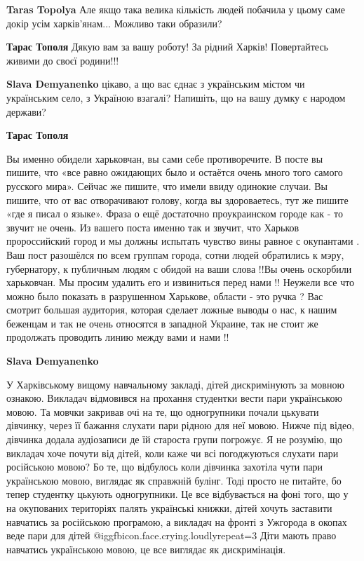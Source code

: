 \begin{itemize}
\begin{itemize}
\textbf{Taras Topolya} Але якщо така велика кількість людей побачила у цьому саме докір усім харків'янам... Можливо таки образили?

\textbf{Тарас Тополя} Дякую вам за вашу роботу! За рідний Харків! Повертайтесь живими до своєї родини!!!

\textbf{Slava Demyanenko} цікаво, а що вас єднає з українським містом чи українським село, з Україною взагалі? Напишіть, що на вашу думку є народом держави?

\textbf{Тарас Тополя} 

Вы именно обидели харьковчан, вы сами себе противоречите. В посте вы пишите,
что «все равно ожидающих было и остаётся очень много того самого русского
мира». Сейчас же пишите, что имели ввиду одинокие случаи. Вы пишите, что от
вас отворачивают голову, когда вы здороваетесь, тут же пишите «где я писал о
языке». Фраза о ещё достаточно проукраинском городе как - то звучит не очень.
Из вашего поста именно так и звучит, что Харьков пророссийский город и мы
должны испытать чувство вины равное с окупантами . Ваш пост разошёлся по всем
группам города, сотни людей обратились к мэру, губернатору, к публичным
людям с обидой на ваши слова !!Вы очень оскорбили харьковчан. Мы просим
удалить его и извиниться перед нами !! Неужели все что можно было показать в
разрушенном Харькове, области - это ручка ? Вас смотрит большая аудитория,
которая сделает ложные выводы о нас, к нашим беженцам и так не очень относятся
в западной Украине, так не стоит же продолжать проводить линию между вами и
нами !!

\textbf{Slava Demyanenko}

У Харківському вищому навчальному закладі, дітей дискримінують за мовною
ознакою. Викладач відмовився на прохання студентки вести пари українською
мовою. Та мовчки закривав очі на те, що одногрупники почали цькувати дівчинку,
через її бажання слухати пари рідною для неї мовою. Нижче під відео, дівчинка
додала аудіозаписи де їй староста групи погрожує. Я не розумію, що викладач
хоче почути від дітей, коли каже чи всі погоджуються слухати пари російською
мовою? Бо те, що відбулось коли дівчинка захотіла чути пари українською мовою,
виглядає як справжній булінг. Тоді просто не питайте, бо тепер студентку
цькують одногрупники. Це все відбувається на фоні того, що у на окупованих
територіях палять українські книжки, дітей хочуть заставити навчатись за
російською програмою, а викладач на фронті з Ужгорода в окопах веде пари для
дітей @igg{fbicon.face.crying.loudly}{repeat=3} Діти мають право навчатись українською мовою, це все виглядає як
дискримінація.


\end{itemize}
\end{itemize}
